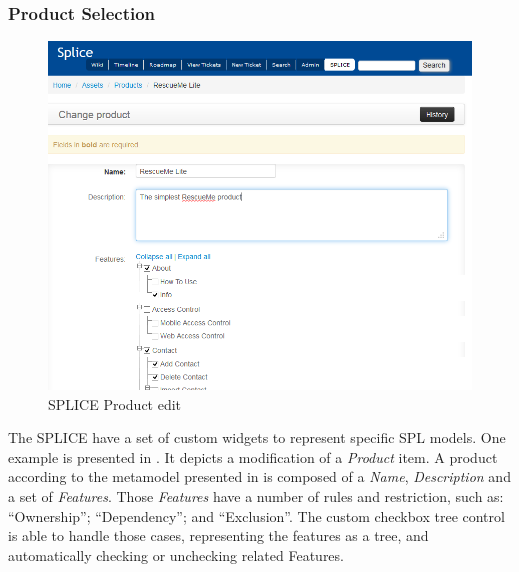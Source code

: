 \subsubsection{Product Selection}
\begin{figure}[htp]
\begin{center}
  \includegraphics[width=16cm]{chapters/proposed_solution/img/captures/Product.PNG}
  \caption[SPLICE Product edit]{SPLICE Product edit }
  \label{fg:splice-product}
\end{center}
\end{figure}

The \ac{SPLICE} have a set of custom widgets to represent specific \ac{SPL} models. One example is presented in . It depicts a modification of a \textit{Product} item. A product according to the metamodel presented in  is composed of a \textit{Name}, \textit{Description} and a set of \textit{Features}. Those \textit{Features} have a number of rules and restriction, such as: “Ownership”; “Dependency”; and “Exclusion”. The custom checkbox tree control is able to handle those cases, representing the features as a tree, and automatically checking or unchecking related Features.


